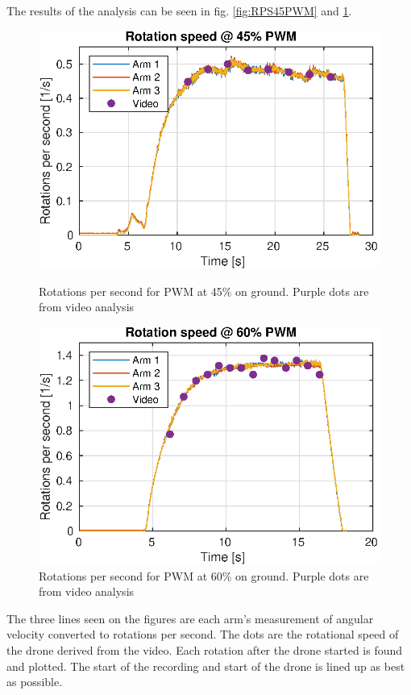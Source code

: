 The results of the analysis can be seen in fig. \ref{fig:RPS45PWM} and \ref{fig:RPS60PWM}. 
\begin{figure}[h!]
    \centering
    \begin{minipage}[t]{0.48\textwidth}
        \centering
        \includegraphics[width=1\textwidth]{figures/results/RPS_45PWM_compared.eps}
    \caption{Rotations per second for PWM at 45\% on ground. Purple dots are from video analysis}
    \label{fig:RPS45PWM}
    \end{minipage}%
    \hspace{.03\textwidth}
    \begin{minipage}[t]{0.48\textwidth}
        \centering
        \includegraphics[width=1\textwidth]{figures/results/RPS_60PWM_compared.eps}
    \caption{Rotations per second for PWM at 60\% on ground. Purple dots are from video analysis}
    \label{fig:RPS60PWM}
    \end{minipage}
\end{figure} 
\FloatBarrier
The three lines seen on the figures are each arm's measurement of angular velocity converted to rotations per second. The dots are the rotational speed of the drone derived from the video. Each rotation after the drone started is found and plotted. The start of the recording and start of the drone is lined up as best as possible.


